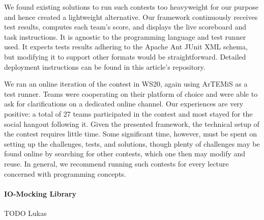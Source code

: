 We found existing solutions
to run such contests too heavyweight for our purpose
and hence created a lightweight alternative.
Our framework continuously receives test results,
computes each team's score,
and displays the live scoreboard and task instructions.
It is agnostic to the programming language and test runner used.
It expects tests results adhering to the Apache Ant JUnit XML schema,
but modifying it to support other formats would be straightforward.
Detailed deployment instructions can be found in this article's repository.

We ran an online iteration of the contest in WS20,
again using ArTEMiS as a test runner.
Teams were cooperating on their platform of choice
and were able to ask for clarifications on a dedicated online channel.
Our experiences are very positive:
a total of 27 teams participated in the contest
and most stayed for the social hangout following it.
Given the presented framework,
the technical setup of the contest requires little time.
Some significant time, however,
must be spent on setting up the challenges,
tests, and solutions,
though plenty of challenges may be found
online by searching for other contests,
which one then may modify and reuse.
In general, we recommend running such contests
for every lecture concerned with programming concepts.


\paragraph{IO-Mocking Library}
TODO Lukas


